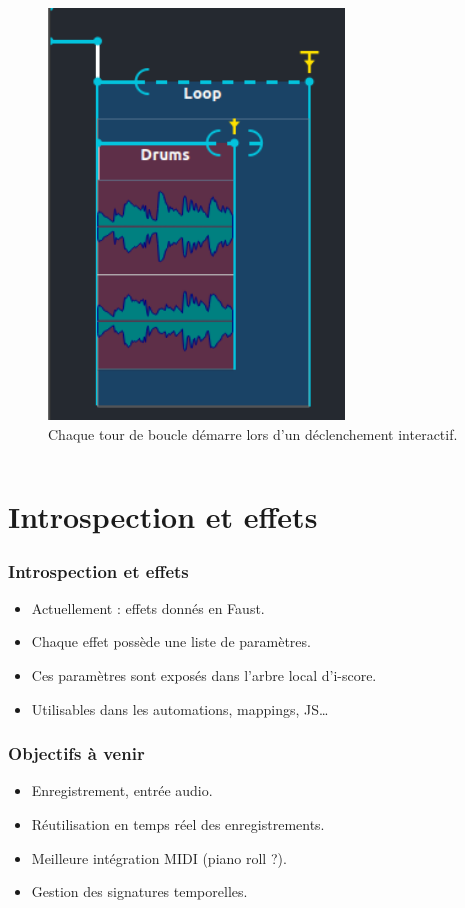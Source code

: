\documentclass[draft]{beamer}
\begin{document}
\begin{frame}
\begin{columns}
\begin{column}{0.5\textwidth}
\begin{figure}
				\includegraphics[width=0.7\textwidth]{images/loop2.png}
				\caption{Chaque tour de boucle démarre lors d'un déclenchement interactif.}
			\end{figure}
		\end{column}
	\end{columns}
\end{frame}  

\section{Introspection et effets}
\begin{frame}
	\frametitle{Introspection et effets}    
	\Large
	\begin{itemize}
		\item<1-> Actuellement : effets donnés en Faust.
		\item<2-> Chaque effet possède une liste de paramètres.
		\item<3-> Ces paramètres sont exposés dans l'arbre local d'i-score.
		\item<4-> Utilisables dans les automations, mappings, JS\dots
	\end{itemize}
	
	
	
\end{frame}

\begin{frame}
	\frametitle{Objectifs à venir} 
	\Large
	\begin{itemize}
		\item<1> Enregistrement, entrée audio.
		\item<2> Réutilisation en temps réel des enregistrements.
		\item<3> Meilleure intégration MIDI (piano roll ?).
		\item<4> Gestion des signatures temporelles.
		
	\end{itemize}
\end{frame}    
\end{document}
